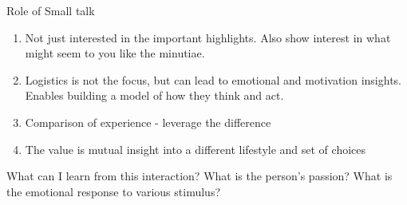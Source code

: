 Role of Small talk
\begin{enumerate}
\item Not just interested in the important highlights. Also show interest in what might seem to you like the minutiae. 
\item Logistics is not the focus, but can lead to emotional and motivation insights. Enables building a model of how they think and act.
\item Comparison of experience - leverage the difference
\item The value is mutual insight into a different lifestyle and set of choices
\end{enumerate}

What can I learn from this interaction?
What is the person's passion?
What is the emotional response to various stimulus?


